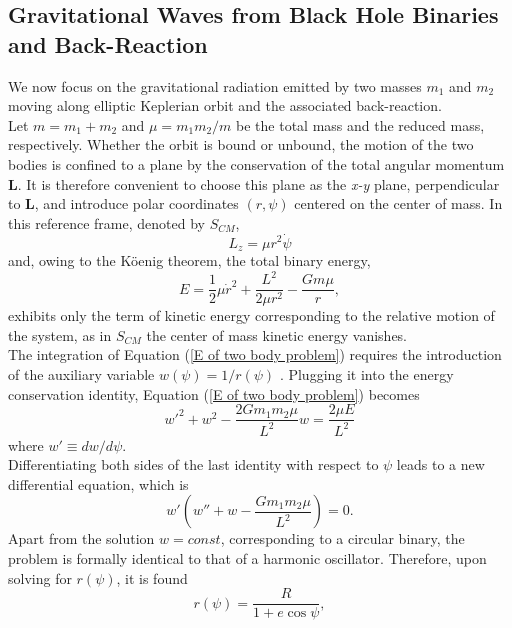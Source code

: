 \documentclass[12pt,twoside,openany]{book}
\begin{document}
\subsection{Gravitational Waves from Black Hole Binaries and Back-Reaction}
We now focus on the gravitational radiation emitted by two masses $m_1$ and $m_2$ moving along elliptic Keplerian orbit and the associated back-reaction.\\Let $m=m_1+m_2$ and $\mu=m_1m_2/{m}$ be the total mass and the reduced mass, respectively. Whether the orbit is bound or unbound, the motion of the two bodies is confined to a plane by the conservation of the total angular momentum $\mathbf{L}$. It is therefore convenient to choose this plane as the \textit{x-y} plane, perpendicular to $\mathbf{L}$, and introduce polar coordinates $(r,\psi)$ centered on the center of mass. In this reference frame, denoted by $S_{CM}$,
\begin{equation}\label{L of two body problem}
    L_z=\mu r^2\dot{\psi}
\end{equation}
and, owing to the Köenig theorem, the total binary energy,
\begin{equation}\label{E of two body problem}
    E=\frac{1}{2}\mu \dot{r}^2+\frac{L^2}{2\mu r^2}-\frac{Gm\mu}{r},
\end{equation}
exhibits only the term of kinetic energy corresponding to the relative motion of the system, as in $S_{CM}$ the center of mass kinetic energy vanishes.\\The integration of Equation (\ref{E of two body problem}) requires the introduction of the auxiliary variable $w(\psi)=1/r(\psi)$ \parencite{Capozziello_2008}. Plugging it into the energy conservation identity, Equation (\ref{E of two body problem}) becomes
\begin{equation}
    w'^2+w^2-\frac{2Gm_1m_2\mu}{L^2}w=\frac{2\mu E}{L^2}
\end{equation}
where $w'\equiv dw/d\psi$.\\Differentiating both sides of the last identity with respect to $\psi$ leads to a new differential equation, which is
\begin{equation}\label{u differential equation}
    w'\left(w''+w-\frac{Gm_1m_2\mu}{L^2}\right)=0.
\end{equation}
Apart from the solution $w=const$, corresponding to a circular binary, the problem is formally identical to that of a harmonic oscillator. Therefore, upon solving for $r(\psi)$, it is found
\begin{equation}\label{two-body solution}
    r(\psi)=\frac{R}{1+e\cos{\psi}},
\end{equation}
\end{document}
